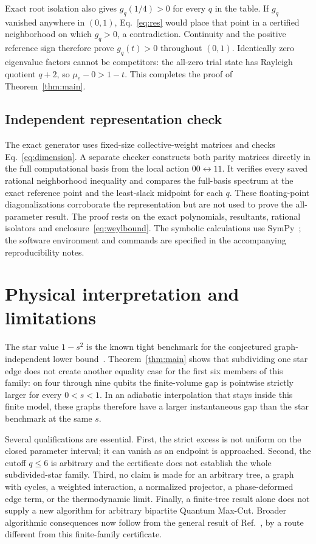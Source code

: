 \documentclass[11pt]{article}
\begin{document}
Exact root isolation also gives \(g_q(1/4)>0\) for every \(q\) in the
table.  If \(g_q\) vanished anywhere in \((0,1)\),
Eq.~\eqref{eq:res} would place that point in a certified neighborhood on
which \(g_q>0\), a contradiction.  Continuity and the positive reference
sign therefore prove \(g_q(t)>0\) throughout \((0,1)\).  Identically zero
eigenvalue factors cannot be competitors: the all-zero trial state has
Rayleigh quotient \(q+2\), so \(\mu_e-0>1-t\).  This completes the proof
of Theorem~\ref{thm:main}.

\subsection{Independent representation check}

The exact generator uses fixed-size collective-weight matrices and checks
Eq.~\eqref{eq:dimension}.  A separate checker constructs both parity
matrices directly in the full computational basis from the local action
\(00\leftrightarrow11\).  It verifies every saved rational neighborhood
inequality and compares the full-basis spectrum at the exact reference
point and the least-slack midpoint for each \(q\).  These floating-point
diagonalizations corroborate the representation but are not used to prove
the all-parameter result.  The proof rests on the exact polynomials,
resultants, rational isolators and enclosure~\eqref{eq:weylbound}.  The
symbolic calculations use SymPy~\cite{meurer2017}; the software environment
and commands are specified in the accompanying reproducibility notes.

\section{Physical interpretation and limitations}

The star value \(1-s^2\) is the known tight benchmark for the conjectured
graph-independent lower bound~\cite{wong2026}.  Theorem~\ref{thm:main}
shows that subdividing one star edge does not create another equality case
for the first six members of this family: on four through nine qubits the
finite-volume gap is pointwise strictly larger for every \(0<s<1\).  In an
adiabatic interpolation that stays inside this finite model, these graphs
therefore have a larger instantaneous gap than the star benchmark at the
same \(s\).

Several qualifications are essential.  First, the strict excess is not
uniform on the closed parameter interval; it can vanish as an endpoint is
approached.  Second, the cutoff \(q\leq6\) is arbitrary and the certificate
does not establish the whole subdivided-star family.  Third, no claim is
made for an arbitrary tree, a graph with cycles, a weighted interaction, a
normalized projector, a phase-deformed edge term, or the thermodynamic
limit.  Finally, a finite-tree result alone does not supply a new algorithm
for arbitrary bipartite Quantum Max-Cut.  Broader algorithmic consequences
now follow from the general result of Ref.~\cite{bravyi2026}, by a route
different from this finite-family certificate.
\end{document}
